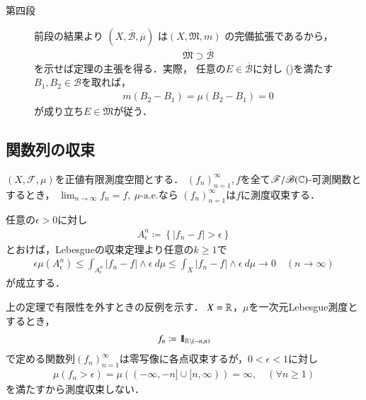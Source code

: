 \begin{prf}
\begin{description}
				\item[第四段]
					前段の結果より
					$\left(X, \overline{\mathcal{B}}, \overline{\mu} \right)$
					は$\left( X, \mathfrak{M}, m \right)$
					の完備拡張であるから，
					\begin{align}
						\overline{\mathfrak{M}}
						\supset \overline{\mathcal{B}}
					\end{align}
					を示せば定理の主張を得る．実際，
					任意の$E \in \overline{\mathcal{B}}$に対し
					()を満たす
					$B_1,B_2 \in \mathcal{B}$を取れば，
					\begin{align}
						m(B_2-B_1)
						= \mu(B_2-B_1)
						= 0
					\end{align}
					が成り立ち$E \in \overline{\mathfrak{M}}$が従う．
					\QED
			\end{description}
		\end{prf}
	
	\subsection{関数列の収束}
		\begin{screen}
			\begin{dfn}[概収束すれば測度収束する]
				$(X,\mathscr{F},\mu)$を正値有限測度空間とする．
				$(f_n)_{n=1}^\infty,f$を全て$\mathscr{F}/\mathscr{B}(\mathbb{C})$-可測関数とするとき，
				$\lim_{n \to \infty} f_n = f,\ \mbox{$\mu$-a.e.}$なら
				$(f_n)_{n=1}^\infty$は$f$に測度収束する．
			\end{dfn}
		\end{screen}
		
		\begin{prf}
			任意の$\epsilon > 0$に対し
			\begin{align}
				A^n_\epsilon \coloneqq \left\{ |f_n - f| > \epsilon \right\}
			\end{align}
			とおけば，Lebesgueの収束定理より任意の$k \geq 1$で
			\begin{align}
				\epsilon \mu\left(A^n_\epsilon\right)
				\leq \int_{A^n_\epsilon} |f_n - f| \wedge \epsilon\ d\mu
				\leq \int_{X} |f_n - f| \wedge \epsilon\ d\mu
				\longrightarrow 0
				\quad (n \longrightarrow \infty)
			\end{align}
			が成立する．
			\QED
		\end{prf}
		
		上の定理で有限性を外すときの反例を示す．
		$X = \mathbb{R}$，$\mu$を一次元Lebesgue測度とするとき，
		\begin{align}
			f_n \coloneqq \mbox{1}\hspace{-0.25em}\mbox{l}_{\mathbb{R} \backslash (-n,n)}
		\end{align}
		で定める関数列$(f_n)_{n=1}^\infty$は零写像に各点収束するが，$0 < \epsilon < 1$に対し
		\begin{align}
			\mu\left( f_n > \epsilon \right) = \mu((-\infty,-n] \cup [n,\infty)) = \infty,
			\quad (\forall n \geq 1)
		\end{align}
		を満たすから測度収束しない．
		
